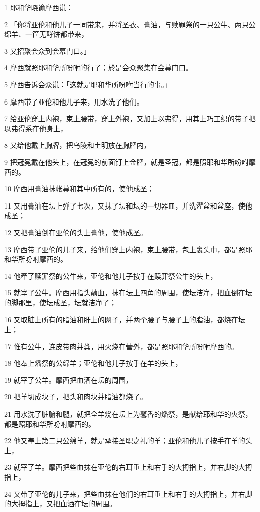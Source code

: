 \par 1 耶和华晓谕摩西说：
\par 2 「你将亚伦和他儿子一同带来，并将圣衣、膏油，与赎罪祭的一只公牛、两只公绵羊、一筐无酵饼都带来，
\par 3 又招聚会众到会幕门口。」
\par 4 摩西就照耶和华所吩咐的行了；於是会众聚集在会幕门口。
\par 5 摩西告诉会众说：「这就是耶和华所吩咐当行的事。」
\par 6 摩西带了亚伦和他儿子来，用水洗了他们。
\par 7 给亚伦穿上内袍，束上腰带，穿上外袍，又加上以弗得，用其上巧工织的带子把以弗得系在他身上，
\par 8 又给他戴上胸牌，把乌陵和土明放在胸牌内，
\par 9 把冠冕戴在他头上，在冠冕的前面钉上金牌，就是圣冠，都是照耶和华所吩咐摩西的。
\par 10 摩西用膏油抹帐幕和其中所有的，使他成圣；
\par 11 又用膏油在坛上弹了七次，又抹了坛和坛的一切器皿，并洗濯盆和盆座，使他成圣；
\par 12 又把膏油倒在亚伦的头上膏他，使他成圣。
\par 13 摩西带了亚伦的儿子来，给他们穿上内袍，束上腰带，包上裹头巾，都是照耶和华所吩咐摩西的。
\par 14 他牵了赎罪祭的公牛来，亚伦和他儿子按手在赎罪祭公牛的头上，
\par 15 就宰了公牛。摩西用指头蘸血，抹在坛上四角的周围，使坛洁净，把血倒在坛的脚那里，使坛成圣，坛就洁净了；
\par 16 又取脏上所有的脂油和肝上的网子，并两个腰子与腰子上的脂油，都烧在坛上；
\par 17 惟有公牛，连皮带肉并粪，用火烧在营外，都是照耶和华所吩咐摩西的。
\par 18 他奉上燔祭的公绵羊；亚伦和他儿子按手在羊的头上，
\par 19 就宰了公羊。摩西把血洒在坛的周围，
\par 20 把羊切成块子，把头和肉块并脂油都烧了。
\par 21 用水洗了脏腑和腿，就把全羊烧在坛上为馨香的燔祭，是献给耶和华的火祭，都是照耶和华所吩咐摩西的。
\par 22 他又奉上第二只公绵羊，就是承接圣职之礼的羊；亚伦和他儿子按手在羊的头上，
\par 23 就宰了羊。摩西把些血抹在亚伦的右耳垂上和右手的大拇指上，并右脚的大拇指上，
\par 24 又带了亚伦的儿子来，把些血抹在他们的右耳垂上和右手的大拇指上，并右脚的大拇指上，又把血洒在坛的周围。
